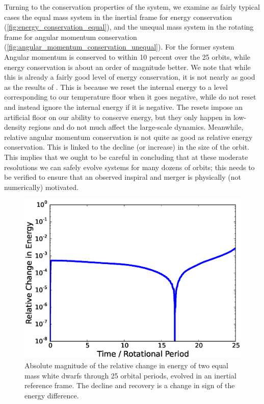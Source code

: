 \documentclass[iop,numberedappendix]{../emulateapj}
\begin{document}
Turning to the conservation properties of the system, we examine as
fairly typical cases the equal mass system in the inertial frame for
energy conservation (\autoref{fig:energy_conservation_equal}), and the
unequal mass system in the rotating frame for angular momentum
conservation (\autoref{fig:angular_momentum_conservation_unequal}).
For the former system Angular momentum is conserved to within 10 percent over the 25
orbits, while energy conservation is about an order of magnitude
better. We note that while this is already a fairly good level of
energy conservation, it is not nearly as good as the results of
\citet{marcello:2012}. This is because we reset the internal energy to
a level corresponding to our temperature floor when it goes negative,
while \citeauthor{marcello:2012} do not reset and instead ignore the
internal energy if it is negative. The resets impose an artificial
floor on our ability to conserve energy, but they only happen in
low-density regions and do not much affect the large-scale dynamics.
Meanwhile, relative angular momentum conservation is not quite as good 
as relative energy conservation.  This is 
linked to the decline (or increase) in the size of the orbit. This
implies that we ought to be careful in concluding that at these
moderate resolutions we can safely evolve systems for many dozens of
orbits; this needs to be verified to ensure that an observed inspiral
and merger is physically (not numerically) motivated.

\begin{figure}
  \centering
  \includegraphics[scale=0.45]{plots/equal_energy_rot0.eps}
  \caption{Absolute magnitude of the relative change in energy of two equal mass white dwarfs through 25 orbital periods,
           evolved in an inertial reference frame. The decline and recovery is a change in sign of the energy difference.
           \label{fig:energy_conservation_equal}}
\end{figure}
\end{document}

